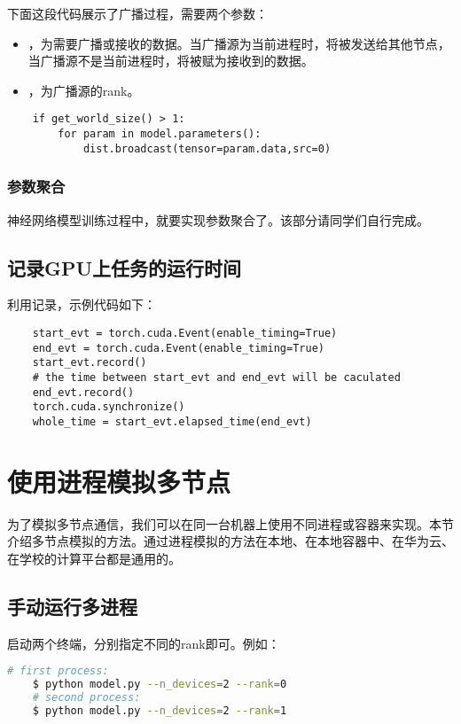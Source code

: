 下面这段代码展示了广播过程，需要两个参数：
\begin{itemize}
    \item {}，为需要广播或接收的数据。当广播源为当前进程时，将被发送给其他节点，当广播源不是当前进程时，将被赋为接收到的数据。
    \item {}，为广播源的rank。
\end{itemize}

\begin{lstlisting}
    if get_world_size() > 1:
        for param in model.parameters():
            dist.broadcast(tensor=param.data,src=0)
\end{lstlisting}

\subsubsection{参数聚合}

神经网络模型训练过程中，就要实现参数聚合了。该部分请同学们自行完成。

\subsection{记录GPU上任务的运行时间}

利用记录，示例代码如下：
\begin{lstlisting}
    start_evt = torch.cuda.Event(enable_timing=True)
    end_evt = torch.cuda.Event(enable_timing=True)
    start_evt.record()
    # the time between start_evt and end_evt will be caculated
    end_evt.record()
    torch.cuda.synchronize()
    whole_time = start_evt.elapsed_time(end_evt)
\end{lstlisting}

\section{使用进程模拟多节点}

为了模拟多节点通信，我们可以在同一台机器上使用不同进程或容器来实现。本节介绍多节点模拟的方法。通过进程模拟的方法在本地、在本地容器中、在华为云、在学校的计算平台都是通用的。

\subsection{手动运行多进程}
启动两个终端，分别指定不同的rank即可。例如：
\begin{lstlisting}[language=bash]
    # first process:
    $ python model.py --n_devices=2 --rank=0
    # second process:
    $ python model.py --n_devices=2 --rank=1
\end{lstlisting}

